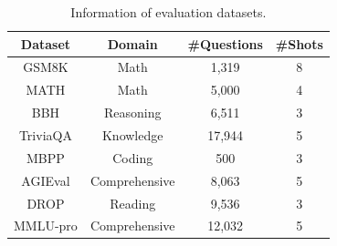 
\label{appix:exp_settings}
\begin{table}
\centering
\small
\caption{Information of evaluation datasets.}
\setlength{\tabcolsep}{3pt}
\begin{tabular}{c|ccc}
\toprule
Dataset & Domain & \#Questions & \#Shots \\
\midrule
GSM8K & Math & 1,319 & 8 \\
MATH & Math & 5,000 & 4 \\
BBH & Reasoning & 6,511 & 3 \\
TriviaQA & Knowledge & 17,944 & 5 \\
MBPP & Coding & 500 & 3 \\
AGIEval& Comprehensive & 8,063 & 5 \\
DROP & Reading & 9,536 & 3 \\
MMLU-pro  & Comprehensive & 12,032 & 5 \\
\bottomrule
\end{tabular}
\label{tab:evaluation_info}
\end{table}




